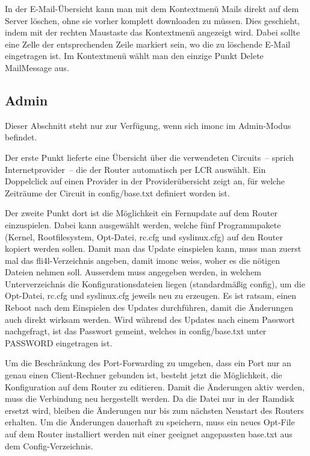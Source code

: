   In der \mbox{E-Mail}-Übersicht kann man mit dem Kontextmenü Mails direkt auf
  dem Server löschen, ohne sie vorher komplett downloaden zu müssen.
  Dies geschieht, indem mit der rechten Maustaste das Kontextmenü
  angezeigt wird. Dabei sollte eine Zelle der entsprechenden Zeile
  markiert sein, wo die zu löschende \mbox{E-Mail} eingetragen ist. Im
  Kontextmenü wählt man den einzige Punkt Delete MailMessage aus.


  \subsection{Admin}

  Dieser Abschnitt steht nur zur Verfügung, wenn sich imonc im
  Admin-Modus befindet.

  Der erste Punkt lieferte eine Übersicht über die verwendeten
  Circuits~-- sprich Internetprovider~-- die der Router automatisch per
  LCR auswählt. Ein Doppelclick auf einen Provider in der
  Providerübersicht zeigt an, für welche Zeiträume der Circuit in
  config/base.txt definiert worden ist.

  Der zweite Punkt dort ist die Möglichkeit ein Fernupdate auf dem
  Router einzuspielen. Dabei kann ausgewählt werden, welche fünf
  Programmpakete (Kernel, Rootfilesystem, Opt-Datei, rc.cfg und syslinux.cfg) auf 
  den Router kopiert werden sollen. Damit man das Update einspielen kann,
  muss man zuerst mal das fli4l-Verzeichnis angeben, damit imonc
  weiss, woher es die nötigen Dateien nehmen soll. Ausserdem muss
  angegeben werden, in welchem Unterverzeichnis die Konfigurationsdateien liegen 
  (standardmäßig config), um die Opt-Datei, rc.cfg und syslinux.cfg 
  jeweils neu zu erzeugen. Es ist ratsam, einen Reboot nach dem Einspielen des
  Updates durchführen, damit die Änderungen auch direkt wirksam
  werden.  Wird während des Updates nach einem Passwort nachgefragt,
  ist das Passwort gemeint, welches in config/base.txt unter PASSWORD
  eingetragen ist.

  Um die Beschränkung des Port-Forwarding zu umgehen, dass ein Port nur
  an genau einen Client-Rechner gebunden ist, besteht jetzt die Möglichkeit,
  die Konfiguration auf dem Router zu editieren. Damit die Änderungen aktiv
  werden, muss die Verbindung neu hergestellt werden. Da die Datei nur in
  der Ramdisk ersetzt wird, bleiben die Änderungen nur bis zum nächsten
  Neustart des Routers erhalten. Um die Änderungen dauerhaft zu speichern,
  muss ein neues Opt-File auf dem Router installiert werden mit einer
  geeignet angepassten base.txt aus dem Config-Verzeichnis.

